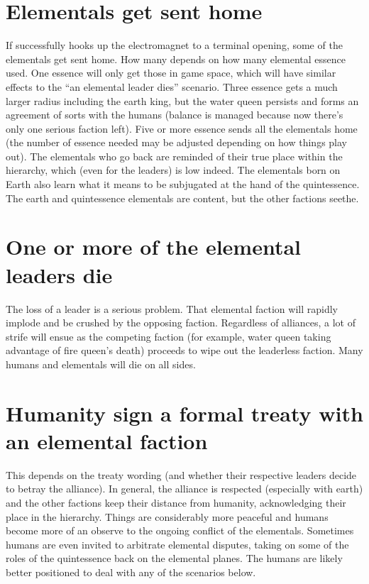 \documentclass[green]{elementals}
\begin{document}
\name{\gEndGame{}}


\section{Elementals get sent home}

If \cGD{\intro} successfully hooks up the electromagnet to a terminal opening, some of the elementals get sent home. How many depends on how many elemental essence \cGD{} used. One essence will only get those in game space, which will have similar effects to the ``an elemental leader dies'' scenario. Three essence gets a much larger radius including the earth king, but the water queen persists and forms an agreement of sorts with the humans (balance is managed because now there's only one serious faction left). Five or more essence sends all the elementals home (the number of essence needed may be adjusted depending on how things play out). The elementals who go back are reminded of their true place within the hierarchy, which (even for the leaders) is low indeed. The elementals born on Earth also learn what it means to be subjugated at the hand of the quintessence. The earth and quintessence elementals are content, but the other factions seethe.

\section{One or more of the elemental leaders die}

The loss of a leader is a serious problem. That elemental faction will rapidly implode and be crushed by the opposing faction. Regardless of alliances, a lot of strife will ensue as the competing faction (for example, water queen taking advantage of fire queen's death) proceeds to wipe out the leaderless faction. Many humans and elementals will die on all sides.

\section{Humanity sign a formal treaty with an elemental faction}

This depends on the treaty wording (and whether their respective leaders decide to betray the alliance). In general, the alliance is respected (especially with earth) and the other factions keep their distance from humanity, acknowledging their place in the hierarchy. Things are considerably more peaceful and humans become more of an observe to the ongoing conflict of the elementals. Sometimes humans are even invited to arbitrate elemental disputes, taking on some of the roles of the quintessence back on the elemental planes. The humans are likely better positioned to deal with any of the scenarios below.
\end{document}
